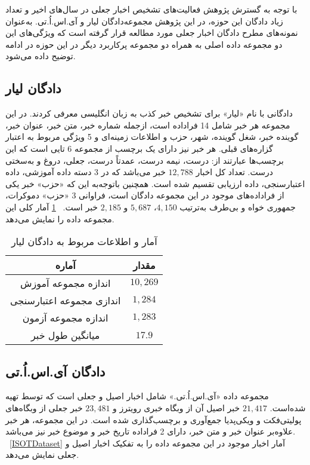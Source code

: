 با توجه به گسترش پژوهش فعالیت‌های تشخیص اخبار جعلی در سال‌های اخیر و تعداد زیاد دادگان این حوزه، در این پژوهش مجموعه‌دادگان لیار و آی.اس.اُ.تی. به‌عنوان نمونه‌های مطرح دادگان اخبار جعلی مورد مطالعه قرار گرفته‌ است که ویژگی‌های این دو مجموعه داده اصلی به همراه دو مجموعه پرکاربرد دیگر در این حوزه در ادامه توضیح داده می‌شود.

\subsection{دادگان لیار}

\noindent \citet{wang2017liar} دادگانی با نام «لیار» برای تشخیص خبر کذب به زبان انگلیسی معرفی کردند. در این مجموعه هر خبر شامل 14 فراداده است، ازجمله شماره خبر، متن خبر، عنوان خبر، گوینده خبر، شغل گوینده، شهر، حزب و اطلاعات زمینه‌ای و 5 ویژگی مربوط به اعتبار گزاره‌های قبلی. هر خبر نیز دارای یک برچسب از مجموعه 6 تایی است که این برچسب‌ها عبارتند از: درست، نیمه درست، عمدتاً درست، جعلی، دروغ و به‌سختی درست. تعداد کل اخبار $12,788$ خبر می‌باشد که در 3 دسته داده آموزشی، داده اعتبارسنجی، داده ارزیابی تقسیم شده‌ است. همچنین باتوجه‌به این که «حزب» خبر یکی از فراداده‌های موجود در این مجموعه دادگان است، فراوانی 3 «حزب» دموکرات، جمهوری خواه و بی‌طرف به‌ترتیب 
$4,150$، $5,687$ و $2,185$ 
خبر است.
\tablename~\ref{liarDataset} آمار کلی این مجموعه داده را نمایش می‌دهد.

\begin{table}[!h]
\caption{آمار و اطلاعات مربوط به دادگان لیار}
\label{liarDataset}
\begin{center}
\begin{tabular}{|c|c|}
\hline
\textbf{آماره} & \textbf{مقدار} \\
\hline
\hline
اندازه مجموعه آموزش
&   $10,269$  \\
\hline
 اندازی مجموعه اعتبارسنجی
 & $1,284$  \\
\hline
  اندازه مجموعه آزمون
  & $1,283$ \\
\hline
 میانگین طول خبر
 & $17.9$  \\
\hline

\end{tabular}
\end{center}
\end{table}


\subsection{دادگان آی.اس.اُ.تی}
مجموعه داده «آی.اس.اُ.تی.» شامل اخبار اصیل و جعلی است که توسط \citet{ahmed2017detection} تهیه شده‌است.
$21,417$ خبر اصیل آن از وبگاه خبری رویترز و $23,481$ خبر جعلی از وبگاه‌های پولیتی‌فکت و ویکی‌پدیا جمع‌آوری و برچسب‌گذاری شده‌ است. در این مجموعه، هر خبر علاوه‌بر عنوان خبر و متن خبر، دارای 2  فراداده تاریخ خبر و موضوع خبر نیز 
می‌باشد. \tablename~\ref{ISOTDataset} آمار اخبار موجود در این مجموعه داده را به تفکیک اخبار اصیل و جعلی نمایش می‌دهد.

